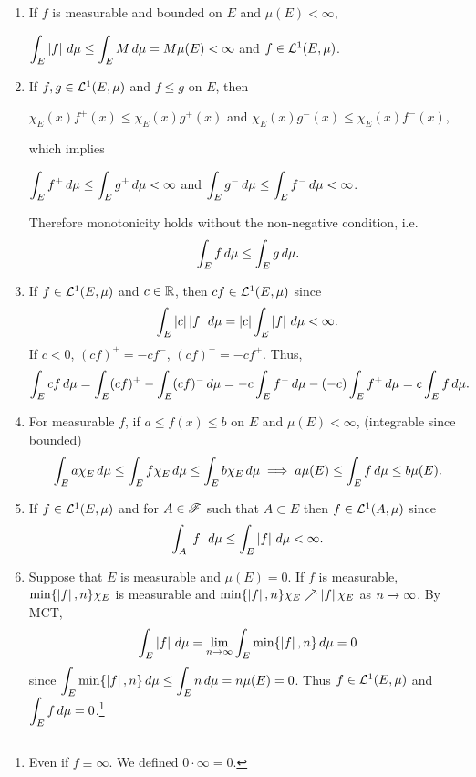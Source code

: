 \pagebreak

\rmk
\begin{enumerate}
    \item {} If \(f\) is measurable and bounded on \(E\) and \(\mu(E) < \infty\),
          \begin{center}
              \(\displaystyle \int_E \left| f \right| \,d{\mu} \leq \int_E M \,d{\mu} = M\mu(E) < \infty\) and \(f \in \mathcal{L}^{1}(E, \mu)\).
          \end{center}
    \item If \(f, g \in \mathcal{L}^{1}(E, \mu)\) and \(f \leq g\) on \(E\), then
          \begin{center}
              \(\chi_E (x) f^+(x) \leq \chi_E(x) g^+(x)\) and \(\chi_E(x) g^-(x) \leq \chi_E (x) f^-(x)\),
          \end{center}
          which implies
          \begin{center}
              \(\displaystyle \int_E f^+ \,d{\mu} \leq \int_E g^+ \,d{\mu} < \infty\) and \(\displaystyle \int_E g^- \,d{\mu} \leq \int_E f^- \,d{\mu} < \infty\).
          \end{center}
          Therefore monotonicity holds without the non-negative condition, i.e.
          \[
              \int_E f\,d{\mu} \leq \int_E g \,d{\mu}.
          \]
    \item If \(f \in \mathcal{L}^{1}(E, \mu)\) and \(c \in \mathbb{R}\), then \(cf \in \mathcal{L}^{1}(E, \mu)\) since
          \[
              \int_E \left| c \right|\left| f \right| \,d{\mu} = \left| c \right| \int_E \left| f \right|\,d{\mu} < \infty.
          \]
          If \(c < 0\), \((cf)^+ = -cf^-\), \((cf)^- = -cf^+\). Thus,
          \[
              \int_E cf \,d{\mu} = \int_E (cf)^+ - \int_E (cf)^- \,d{\mu} = -c \int_E f^- \,d{\mu} - (-c) \int_E f^+ \,d{\mu} = c\int_E f\,d{\mu}.
          \]
    \item For measurable \(f\), if \(a\leq f(x) \leq b\) on \(E\) and \(\mu(E) < \infty\), (integrable since bounded)
          \[
              \int_E a \chi_E \,d{\mu} \leq \int_E f\chi_E \,d{\mu} \leq \int_E b \chi_E \,d{\mu} \implies a \mu(E) \leq \int_E f \,d{\mu} \leq b \mu(E).
          \]
    \item If \(f \in \mathcal{L}^{1}(E, \mu)\) and for \(A \in \mathscr{F}\) such that \(A \subset E\) then \(f \in \mathcal{L}^{1}(A, \mu)\) since
          \[
              \int_A \left| f \right| \,d{\mu} \leq \int_E \left| f \right|\,d{\mu} < \infty.
          \]
    \item Suppose that \(E\) is measurable and \(\mu(E) = 0\). If \(f\) is measurable, \(\min\{\left| f \right|, n\}\chi_E\) is measurable and \(\min\{\left| f \right|, n\}\chi_E \nearrow \left| f \right|\chi_E\) as \(n \rightarrow \infty\). By MCT,
          \[
              \int_E \left| f \right| \,d{\mu} = \lim_{n \rightarrow \infty} \int_E \min\{\left| f \right|, n\} \,d{\mu} = 0
          \]
          since \(\displaystyle \int_E \min\{\left| f \right|, n\} \,d{\mu} \leq \int_E n \,d{\mu} = n \mu(E) = 0\).
          Thus \(f \in \mathcal{L}^{1}(E, \mu)\) and \(\displaystyle \int_E f \,d{\mu} = 0\).\footnote{Even if \(f \equiv \infty\). We defined \(0\cdot\infty = 0\).}
\end{enumerate}

